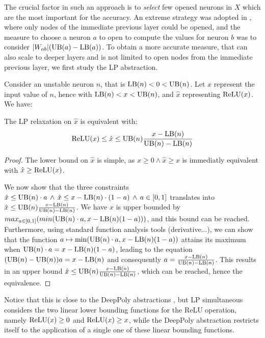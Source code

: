 The crucial factor in such an approach is to {\em select} few opened neurons in $X$ which are the most important for the accuracy. An extreme strategy was adopted in \cite{DivideAndSlide}, where only nodes of the immediate previous layer could be opened, and the measure to choose a neuron $a$ to open to compute the values for neuron $b$ was to consider $|W_{ab}| (\mathrm{UB}(a)-\mathrm{LB}(a))$. To obtain a more accurate measure, that can also scale to deeper layers and is not limited to open nodes from the immediate previous layer, we first study the LP abstraction.

Consider an unstable neuron $n$, that is $\mathrm{LB}(n) < 0 < \mathrm{UB}(n)$. 
Let $x$ represent the input value of $n$, hence with 
$\mathrm{LB}(n) < x < \mathrm{UB}(n)$, and $\hat{x}$ representing $\mathrm{ReLU}(x)$. 
We have:


\begin{proposition}
	\label{LP}
	The LP relaxation on $\hat{x}$ is equivalent with:
	\begin{align}
		\mathrm{ReLU}(x) \leq \hat{x} \leq \mathrm{UB}(n) \frac{x-\mathrm{LB}(n)}{\mathrm{UB}(n)-\mathrm{LB}(n)} \label{eq:deeppoly}
	\end{align} 
\end{proposition}
 


\begin{proof}
The lower bound on $\hat{x}$ is simple, as $\hat{x} \geq 0 \wedge \hat{x} \geq x$ is immediatly equivalent with $\hat{x} \geq \mathrm{ReLU}(x)$.

We now show that the three constraints 
$\hat{x} \leq \mathrm{UB}(n) \cdot a \, \wedge \, \hat{x} \leq x-\mathrm{LB}(n) \cdot (1-a) \, \wedge \, a \in [0,1]$ translates into $\hat{x} \leq \mathrm{UB}(n) \frac{x-\mathrm{LB}(n)}{\mathrm{UB}(n)-\mathrm{LB}(n)}$. 
We have $\hat{x}$ is upper bounded by $max_{a \in [0,1]} (min(\mathrm{UB}(n) \cdot a, x - \mathrm{LB}(n) (1-a)))$, and this bound can be reached. Furthermore, using standard function analysis tools (derivative...), we can show that the function $a \mapsto \min(\mathrm{UB}(n) \cdot a, x - \mathrm{LB}(n) (1-a))$ attains its maximum when $\mathrm{UB}(n) \cdot a = x - \mathrm{LB}(n) (1-a)$, leading to the equation $(\mathrm{UB}(n) - \mathrm{UB}(n)) a = x - \mathrm{LB}(n)$ and consequently $a = \frac{x - \mathrm{LB}(n)}{\mathrm{UB}(n)-\mathrm{LB}(n)}$. This results in an upper bound $\hat{x} \leq \mathrm{UB}(n) \frac{x - \mathrm{LB}(n)}{\mathrm{UB}(n)-\mathrm{LB}(n)}$, which can be reached, hence the equivalence.
\end{proof}

Notice that this is close to the DeepPoly abstractions \cite{deeppoly}, but LP simultaneous considers the two linear lower bounding functions for the ReLU operation, namely $\mathrm{ReLU}(x) \geq 0$ and $\mathrm{ReLU}(x) \geq x$, while the DeepPoly abstraction restricts itself to the application of a single one of these linear bounding functions.
